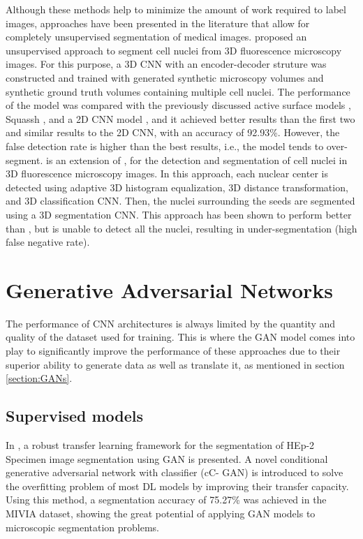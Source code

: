 Although these methods help to minimize the amount of work required to label images, approaches have been presented in the literature that allow for completely unsupervised segmentation of medical images. \citet{SOTA:3DCNN} proposed an unsupervised approach to segment cell nuclei from \ac{3D} fluorescence microscopy images. For this purpose, a \ac{3D} \ac{CNN} with an encoder-decoder struture was constructed and trained with generated synthetic microscopy volumes and synthetic ground truth volumes containing multiple cell nuclei. The performance of the model was compared with the previously discussed active surface models \cite{3D:active,active:inhmo}, Squassh \cite{squassh}, and a \ac{2D} \ac{CNN} model \cite{2dplus}, and it achieved better results than the first two and similar results to the \ac{2D} \ac{CNN}, with an accuracy of 92.93\%. However, the false detection rate is higher than the best results, i.e., the model tends to over-segment. \cite{3d:detection} is an extension of \cite{SOTA:3DCNN}, for the detection and segmentation of cell nuclei in \ac{3D} fluorescence microscopy images. In this approach, each nuclear center is detected using adaptive \ac{3D} histogram equalization, \ac{3D} distance transformation, and \ac{3D} classification \ac{CNN}. Then, the nuclei surrounding the seeds are segmented using a \ac{3D} segmentation \ac{CNN}. This approach has been shown to perform better than \cite{SOTA:3DCNN}, but is unable to detect all the nuclei, resulting in under-segmentation (high false negative rate). 

\section{Generative Adversarial Networks}

The performance of \ac{CNN} architectures is always limited by the quantity and quality of the dataset used for training. This is where the \ac{GAN} model comes into play to significantly improve the performance of these approaches due to their superior ability to generate data as well as translate it, as mentioned in section \ref{section:GANs}.

\subsection{Supervised models}

In \cite{cCGAN}, a robust transfer learning framework for the segmentation of HEp-2 Specimen image segmentation using \ac{GAN} is presented. A novel conditional generative adversarial network with classifier (cC- GAN) is introduced to solve the overfitting problem of most DL models by improving their transfer capacity. Using this method, a segmentation accuracy of 75.27\% was achieved in the MIVIA dataset, showing the great potential of applying \ac{GAN} models to microscopic segmentation problems.

